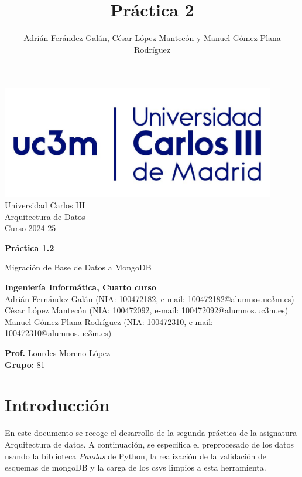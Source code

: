 \documentclass[]{article}
\title{Práctica 2}
\author{Adrián Ferández Galán, César López Mantecón y Manuel Gómez-Plana Rodríguez}
\begin{document}
\begin{titlepage}
    \centering
   \includegraphics[width=0.9\textwidth]{uc3m.jpg} 
    {\Huge Universidad Carlos III\\
    
     \Large Arquitectura de Datos\\
     \vspace{0.5cm}
     Curso 2024-25}
    \vspace{2cm}

    {\Huge \textbf{Práctica 1.2} \par}
    \vspace{0.5cm}
    {\Large Migración de Base de Datos a MongoDB \par}
    \vspace{8cm}

   \textbf{Ingeniería Informática, Cuarto curso}\\
    \vspace{0.2cm} 
    Adrián Fernández Galán       (NIA: 100472182, e-mail: 100472182@alumnos.uc3m.es)\\
    César López Mantecón         (NIA: 100472092, e-mail: 100472092@alumnos.uc3m.es)\\
    Manuel Gómez-Plana Rodríguez (NIA: 100472310, e-mail: 100472310@alumnos.uc3m.es)
    \vspace{0.5cm}

   
    \textbf{Prof.} Lourdes Moreno López\\
    
    \textbf{Grupo: } 81   
    
\end{titlepage}
\newpage

\renewcommand{\contentsname}{\centering Índice}
\tableofcontents

\newpage
\section{Introducción}
\label{sec:introduccion}
En este documento se recoge el desarrollo de la segunda práctica de la asignatura Arquitectura de datos. A continuación, se especifica el preprocesado de los datos usando la biblioteca \textit{Pandas} de Python, la realización de la validación de esquemas de mongoDB y la carga de los csvs limpios a esta herramienta.
\end{document}
